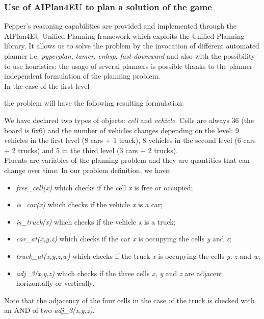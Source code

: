 \documentclass{article}
\begin{document}
\subsubsection{Use of AIPlan4EU to plan a solution of the game}
Pepper's reasoning capabilities are provided and implemented through the AIPlan4EU Unified Planning framework which exploits the Unified Planning library. It allows us to solve the problem by the invocation of different automated planner i.e. \textit{pyperplan}, \textit{tamer}, \textit{enhsp}, \textit{fast-downward} and also with the possibility to use heuristics: the usage of several planners is possible thanks to the planner-independent formulation of the planning problem.\\
\indent In the case of the first level

the problem will have the following resulting formulation:

\indent We have declared two types of objects: \textit{cell} and \textit{vehicle}. Cells are always 36 (the board is 6x6) and the number of vehicles changes depending on the level: 9 vehicles in the first level (8 cars + 1 truck),  8 vehicles in the second level (6 cars + 2 trucks) and 5 in the third level (3 cars + 2 trucks).\\
\indent Fluents are variables of the planning problem and they are quantities that can change over time. In our problem definition, we have:
\begin{itemize}
    \item  \textit{free\_cell(x)} which checks if the cell \textit{x} is free or occupied;
    \item  \textit{is\_car(x)} which checks if the vehicle \textit{x} is a car;
    \item  \textit{is\_truck(x)} which checks if the vehicle \textit{x} is a truck;
    \item  \textit{car\_at(x,y,z)} which checks if the car \textit{x} is occupying the cells \textit{y} and \textit{z};
    \item  \textit{truck\_at(x,y,z,w)} which checks if the truck \textit{x} is occupying the cells \textit{y}, \textit{z} and \textit{w};
    \item  \textit{adj\_3(x,y,z)} which checks if the three cells \textit{x}, \textit{y} and \textit{z} are adjacent horizontally or vertically.
\end{itemize}
Note that the adjacency of the four cells in the case of the truck is checked with an AND of two \textit{adj\_3(x,y,z)}.\\
\end{document}
